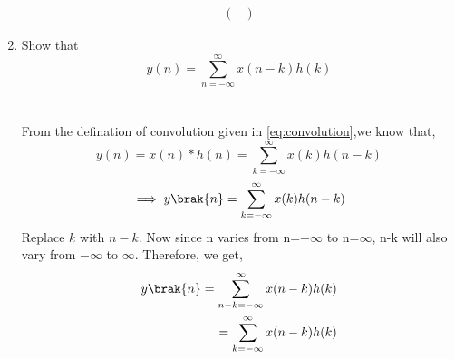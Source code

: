 \documentclass[journal,12pt,twocolumn]{IEEEtran}
\renewcommand\thesection{\arabic{section}}
\begin{document}
\begin{enumerate}[label=\thesection.\arabic*]
\begin{align}
\begin{pmatrix}
	\end{pmatrix}
\end{align}
\item Show that
\begin{equation}
y(n) =  \sum_{n=-\infty}^{\infty}x(n-k)h(k)
\end{equation}
\\\solution\\
From the defination of convolution given in \eqref{eq:convolution},we know that,
\begin{equation}
	y(n) = x(n)*h(n) = \sum_{k=-\infty}^{\infty}x(k)h(n-k)
\end{equation}
\begin{align}
	\implies y\brak{n} = \sum_{k=-\infty}^{\infty}x(k)h(n-k)
\end{align}
Replace $k$ with $n-k$. Now since n varies from n=$-\infty$ to n=$\infty$, n-k will also vary from $-\infty$ to $\infty$. Therefore, we get,
\begin{align}
	y\brak{n} = \sum_{n-k=-\infty}^{\infty}x(n-k)h(k)	
	\\=\sum_{k=-\infty}^{\infty}x(n-k)h(k)
\end{align}
\end{enumerate}

%
\end{document}
